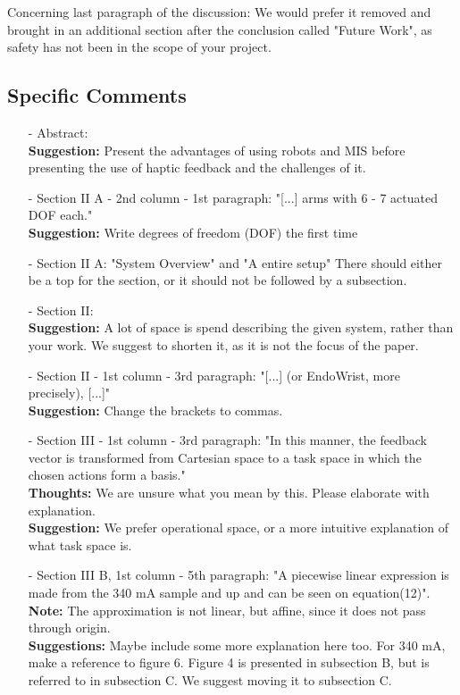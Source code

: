\vspace{-7pt}\noindent
Concerning last paragraph of the discussion: We would prefer it removed and brought in an additional section after the conclusion called "Future Work", as safety has not been in the scope of your project.

\subsection{Specific Comments}
\begin{itemize}
	\item[-] Abstract: \\
           \textbf{Suggestion:} Present the advantages of using robots and MIS before presenting the use of haptic feedback and the challenges of it. 

	\item[-] Section II A - 2nd column - 1st paragraph: "[...] arms with 6 - 7 actuated DOF each." \\
           \textbf{Suggestion:} Write degrees of freedom (DOF) the first time

	\item[-] Section II A: "System Overview" and "A entire setup"
	         There should either be a top for the section, or it should not be followed by a subsection.

	\item[-] Section II: \\
           \textbf{Suggestion:} A lot of space is spend describing the given system, rather than your work. We suggest to shorten it, as it is not the focus of the paper. 

	\item[-] Section II - 1st column - 3rd paragraph: "[...] (or EndoWrist, more precisely), [...]"\\
           \textbf{Suggestion:} Change the brackets to commas. 

	\item[-] Section III - 1st column - 3rd paragraph: "In this manner, the feedback vector is transformed from Cartesian space to a task space in which the chosen actions form a basis."\\
           \textbf{Thoughts:} We are unsure what you mean by this. Please elaborate with explanation.\\
           \textbf{Suggestion:} We prefer operational space, or a more intuitive explanation of what task space is.
\pagebreak
	\item[-] Section III B, 1st column - 5th paragraph: "A piecewise linear expression is made from the 340 mA sample and up and can be seen on equation(12)". \\
           \textbf{Note:} The approximation is not linear, but affine, since it does not pass through origin.\\
           \textbf{Suggestions:} Maybe include some more explanation here too. For 340 mA, make a reference to figure 6. Figure 4 is presented in subsection B, but is referred to in subsection C. We suggest moving it to subsection C.


\end{itemize}
